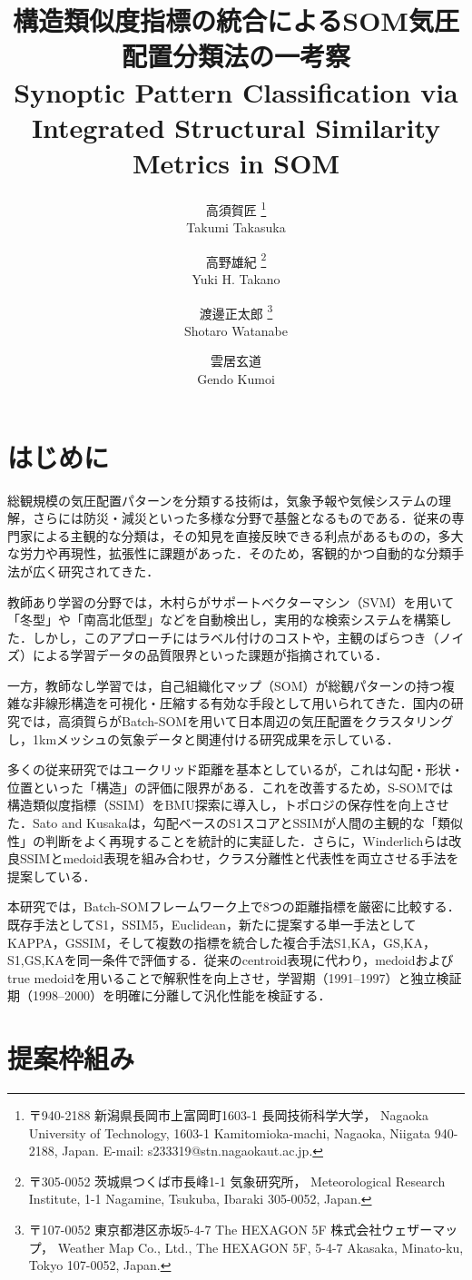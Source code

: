 \documentclass{jarticle}
\title{
  構造類似度指標の統合によるSOM気圧配置分類法の一考察\\
  Synoptic Pattern Classification via Integrated Structural Similarity Metrics in SOM
}
\author{
  高須賀匠
  \thanks{ %
    〒940-2188 新潟県長岡市上富岡町1603-1 長岡技術科学大学，
    Nagaoka University of Technology, 1603-1 Kamitomioka-machi, Nagaoka, Niigata 940-2188, Japan. E-mail: s233319@stn.nagaokaut.ac.jp.
  }\\
  Takumi Takasuka
  \and
  高野雄紀
  \thanks{
    〒305-0052 茨城県つくば市長峰1-1 気象研究所，
    Meteorological Research Institute, 1-1 Nagamine, Tsukuba, Ibaraki 305-0052, Japan.
  }\\
  Yuki H. Takano
  \and
  渡邊正太郎
  \thanks {
    〒107-0052 東京都港区赤坂5-4-7 The HEXAGON 5F 株式会社ウェザーマップ，
    Weather Map Co., Ltd., The HEXAGON 5F, 5-4-7 Akasaka, Minato-ku, Tokyo 107-0052, Japan.
  }\\
  Shotaro Watanabe
  \and
  雲居玄道
  \footnotemark[1]\\
  Gendo Kumoi
}
\theoremstyle{definition}
\begin{document}
\maketitle

\section{はじめに}
総観規模の気圧配置パターンを分類する技術は，気象予報や気候システムの理解，さらには防災・減災といった多様な分野で基盤となるものである．従来の専門家による主観的な分類は，その知見を直接反映できる利点があるものの，多大な労力や再現性，拡張性に課題があった．そのため，客観的かつ自動的な分類手法が広く研究されてきた．

教師あり学習の分野では，木村ら\cite{木村広希2009サポートベクターマシンを用いた気圧配置検出手法の提案}がサポートベクターマシン（SVM）を用いて「冬型」や「南高北低型」などを自動検出し，実用的な検索システムを構築した．しかし，このアプローチにはラベル付けのコストや，主観のばらつき（ノイズ）による学習データの品質限界といった課題が指摘されている．

一方，教師なし学習では，自己組織化マップ（SOM）が総観パターンの持つ複雑な非線形構造を可視化・圧縮する有効な手段として用いられてきた\cite{philippopoulos2014performance,jiang2013classification}．国内の研究では，高須賀ら\cite{takasuka2024}がBatch-SOMを用いて日本周辺の気圧配置をクラスタリングし，1kmメッシュの気象データと関連付ける研究成果を示している．

多くの従来研究ではユークリッド距離を基本としているが，これは勾配・形状・位置といった「構造」の評価に限界がある．これを改善するため，S-SOM\cite{doan2021s}では構造類似度指標（SSIM）をBMU探索に導入し，トポロジの保存性を向上させた．Sato and Kusaka\cite{SATOTakuto20212021-047}は，勾配ベースのS1スコアとSSIMが人間の主観的な「類似性」の判断をよく再現することを統計的に実証した．さらに，Winderlichら\cite{winderlich2024classification}は改良SSIMとmedoid表現を組み合わせ，クラス分離性と代表性を両立させる手法を提案している．

本研究では，Batch-SOMフレームワーク上で8つの距離指標を厳密に比較する．既存手法としてS1，SSIM5，Euclidean，新たに提案する単一手法としてKAPPA，GSSIM，そして複数の指標を統合した複合手法S1,KA，GS,KA，S1,GS,KAを同一条件で評価する．従来のcentroid表現に代わり，medoidおよびtrue medoidを用いることで解釈性を向上させ，学習期（1991–1997）と独立検証期（1998–2000）を明確に分離して汎化性能を検証する．

\section{提案枠組み}
\end{document}
